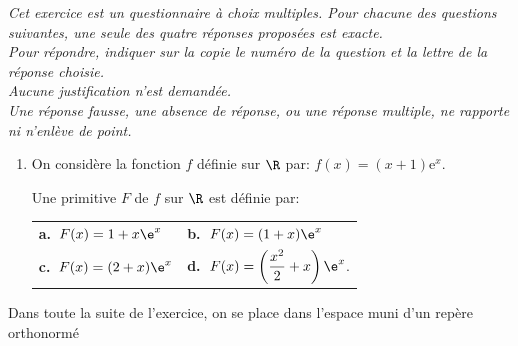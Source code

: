 \medskip

\emph{Cet exercice est un questionnaire à choix multiples. Pour chacune des questions suivantes, une seule des quatre réponses proposées est exacte. \\
Pour répondre, indiquer sur la copie le numéro de la question et la lettre de la réponse choisie. \\
Aucune justification n'est demandée. \\
Une réponse fausse, une absence de réponse, ou une réponse multiple, ne rapporte
ni n'enlève de point.}

\medskip

\begin{enumerate}
\item On considère la fonction $f$ définie sur $\R$ par: $f(x) = (x + 1)\text{e}^x$. 

Une primitive $F$ de $f$ sur $\R$ est définie par:
\begin{center}
\begin{tabularx}{\linewidth}{X X}
\textbf{a.~}$F(x) = 1+x\e^x$ &\textbf{b.~}$F(x) = (1+x)\e^x$\\
\textbf{c.~}$F(x) = (2 + x)\e^x$&\textbf{d.~}$F(x) = \left(\dfrac{x^2}{2}  + x\right)\e^x$.
\end{tabularx}
\end{center}
\end{enumerate}
Dans toute la suite de l'exercice, on se place dans l'espace muni d'un repère
orthonormé \Oijk

